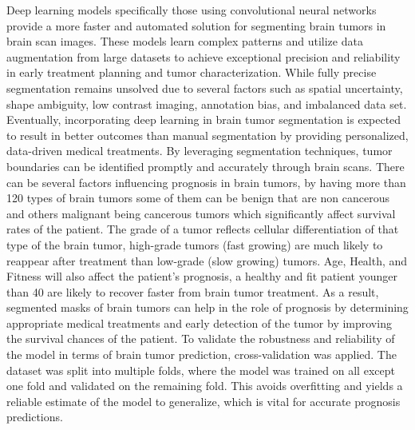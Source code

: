 \documentclass[conference]{IEEEtran}
\begin{document}
Deep learning models specifically those using convolutional neural networks provide a more faster and automated solution for segmenting brain tumors in  brain scan images. These models learn complex patterns and utilize data augmentation from large datasets to achieve exceptional precision and reliability in early treatment planning and tumor characterization. While fully precise segmentation remains unsolved due to several factors such as spatial uncertainty, shape ambiguity, low contrast imaging, annotation bias, and imbalanced data set. Eventually, incorporating deep learning in brain tumor segmentation is expected to result in better outcomes than manual segmentation by providing personalized, data-driven medical treatments. By leveraging segmentation techniques, tumor boundaries can be identified promptly and accurately through brain scans. There can be several factors influencing prognosis in brain tumors, by having more than 120 types of brain tumors some of them can be benign that are non cancerous and others malignant being cancerous tumors which significantly affect survival rates of the patient. The grade of a tumor reflects cellular differentiation of that type of the brain tumor, high-grade tumors (fast growing) are much likely to reappear after treatment than low-grade (slow growing) tumors. Age, Health, and Fitness will also affect the patient's prognosis, a healthy and fit patient younger than 40 are likely to recover faster from brain tumor treatment. As a result, segmented masks of brain tumors can help in the role of prognosis by determining appropriate medical treatments and early detection of the tumor by improving the survival chances of the patient. To validate the robustness and reliability of the model in terms of brain tumor prediction, cross-validation was applied. The dataset was split into multiple folds, where the model was trained on all except one fold and validated on the remaining fold. This avoids overfitting and yields a reliable estimate of the model to generalize, which is vital for accurate prognosis predictions\cite{b3}.
\end{document}
